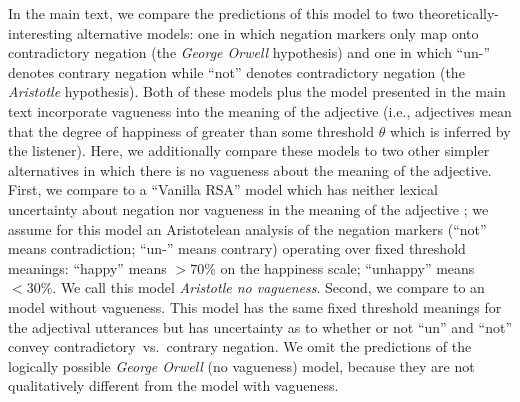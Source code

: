 \documentclass[floatsintext,doc]{apa6}
\begin{document}
In the main text, we compare the predictions of this \ourmodel model to two theoretically-interesting alternative models: one in which negation markers only map onto contradictory negation (the \emph{George Orwell} hypothesis) and one in which ``un-'' denotes contrary negation while ``not'' denotes contradictory negation (the \emph{Aristotle} hypothesis). 
Both of these models plus the \ourmodel model presented in the main text incorporate vagueness into the meaning of the adjective (i.e., adjectives mean that the degree of happiness of greater than some threshold $\theta$ which is inferred by the listener).
Here, we additionally compare these models to two other simpler alternatives in which there is no vagueness about the meaning of the adjective. 
First, we compare to a ``Vanilla RSA'' model which has neither lexical uncertainty about negation nor vagueness in the meaning of the adjective \cite{Frank2012}; we assume for this model an Aristotelean analysis of the negation markers (``not'' means contradiction; ``un-'' means contrary) operating over fixed threshold meanings: \enquote{happy} means \(>70\%\) on the happiness scale; \enquote{unhappy} means \(<30\%\).
We call this model \emph{Aristotle no vagueness}.
Second, we compare to an \ourmodel model without vagueness. 
This model has the same fixed threshold meanings for the adjectival utterances but has uncertainty as to whether or not ``un'' and ``not'' convey contradictory~vs.~contrary negation. 
We omit the predictions of the logically possible \emph{George Orwell} (no vagueness) model, because they are not qualitatively different from the model with vagueness.
\end{document}
